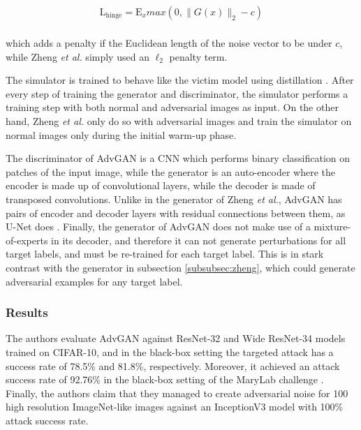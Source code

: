 \begin{equation}
\begin{aligned}
\mathrm{L}_\textrm{hinge} = \mathrm{E}_x max(0, \|G(x)\|_2 - c)\\
\label{eq:advgan_hing_loss}
\end{aligned}
\end{equation}

which adds a penalty if the Euclidean length of the noise vector to be under $c$, while Zheng \textit{et al.} simply used an $\ell_2$ penalty term.

The simulator is trained to behave like the victim model using distillation \cite{distillation}. After every step of training the generator and discriminator, the simulator performs a training step with both normal and adversarial images as input. On the other hand, Zheng \textit{et al.} \cite{zheng_black_box_GAN} only do so with adversarial images and train the simulator on normal images only during the initial warm-up phase.

The discriminator of AdvGAN is a CNN which performs binary classification on patches of the input image, while the generator is an auto-encoder where the encoder is made up of convolutional layers, while the decoder is made of transposed convolutions. Unlike in the generator of Zheng \textit{et al.}, AdvGAN has pairs of encoder and decoder layers with residual connections between them, as U-Net does \cite{unet}. Finally, the generator of AdvGAN does not make use of a mixture-of-experts in its decoder, and therefore it can not generate perturbations for all target labels, and must be re-trained for each target label. This is in stark contrast with the generator in subsection \ref{subsubsec:zheng}, which could generate adversarial examples for any target label.

\subsubsection{Results}

The authors evaluate AdvGAN against ResNet-32 and Wide ResNet-34 \cite{resnet} models trained on CIFAR-10, and in the black-box setting the targeted attack has a success rate of 78.5\% and 81.8\%, respectively. Moreover, it achieved an attack success rate of 92.76\% in the black-box setting of the MaryLab challenge \cite{madrylab}. Finally, the authors claim that they managed to create adversarial noise for 100 high resolution ImageNet-like images against an InceptionV3 model \cite{inceptionv3} with 100\% attack success rate.

